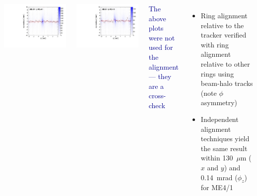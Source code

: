 \documentclass[compress]{beamer}
\begin{document}
\begin{frame}
\begin{columns}
\begin{columns}
\includegraphics[width=\linewidth]{BHCrossCheck_mep41_after.pdf}

\includegraphics[width=\linewidth]{BHCrossCheck_mem41_after.pdf}
\end{columns}

\vspace{0.3 cm}
\centering \textcolor{darkblue}{The above plots were not used for the alignment--- they are a cross-check}

\begin{itemize}
\item Ring alignment relative to the tracker verified with ring
  alignment relative to other rings using beam-halo tracks (note $\phi$ asymmetry)

\item Independent alignment techniques yield the same result within
  130~$\mu$m ($x$ and $y$) and 0.14~mrad ($\phi_z$) for ME4/1
\end{itemize}
\end{columns}
\end{frame}
\end{document}
